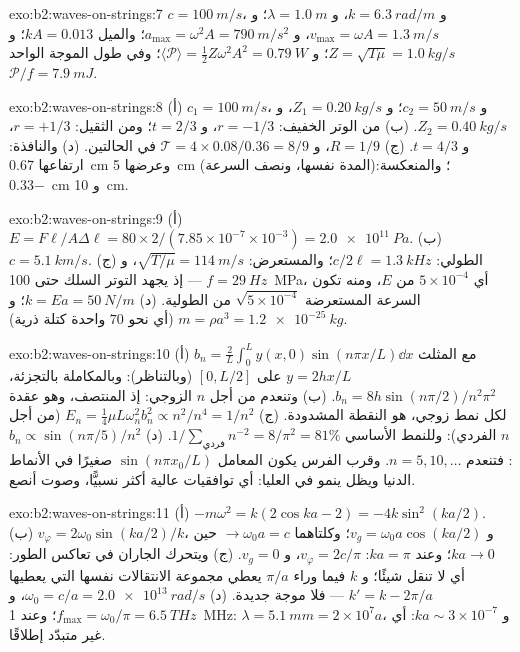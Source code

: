 \begin{solution}{exo:b2:waves-on-strings:7}
$c = \qty{100}{m/s}$، و $k = \qty{6.3}{rad/m}$، و $\lambda = \qty{1.0}{m}$؛ و $v_{\max} = \omega A =
\qty{1.3}{m/s}$، و $a_{\max} = \omega^2A = \qty{790}{m/s^2}$؛ والميل $kA = 0.013$؛ و $Z =
\sqrt{T\mu} = \qty{1.0}{kg/s}$؛ و $\langle\mathcal P\rangle = \tfrac12Z\omega^2A^2 = \qty{0.79}{W}$؛
وفي طول الموجة الواحد $\mathcal P/f = \qty{7.9}{mJ}$.
\end{solution}

\begin{solution}{exo:b2:waves-on-strings:8}
(أ) $c_1 = \qty{100}{m/s}$، و $c_2 = \qty{50}{m/s}$؛ و $Z_1 = \qty{0.20}{kg/s}$، و $Z_2 = \qty{0.40}{kg/s}$.
(ب) من الوتر الخفيف: $r = -1/3$، و $t = 2/3$؛ ومن الثقيل: $r =
+1/3$، و $t = 4/3$. (ج) $R = 1/9$، و $\mathcal T = 4 \times 0.08/0.36 = 8/9$ في الحالتين.
(د) والنافذة: ارتفاعها \qty{0.67}{cm} وعرضها \qty{5}{cm} (المدة نفسها، ونصف
السرعة)؛ والمنعكسة: \qty{-0.33}{cm} و \qty{10}{cm}.
\end{solution}

\begin{solution}{exo:b2:waves-on-strings:9}
(أ) $E = F\ell/A\Delta\ell = 80 \times 2/(7.85 \times 10^{-7} \times 10^{-3}) = \qty{2.0e11}{Pa}$.
(ب) $c = \qty{5.1}{km/s}$. (ج) الطولي: $c/2\ell = \qty{1.3}{kHz}$؛ والمستعرض:
$\sqrt{T/\mu} = \qty{114}{m/s}$، و $f = \qty{29}{Hz}$ --- إذ يجهد التوتر
السلك حتى \qty{100}{MPa}، أي $5 \times 10^{-4}$ من $E$، ومنه تكون السرعة المستعرضة
$\sqrt{5 \times 10^{-4}}$ من الطولية. (د) $k = Ea = \qty{50}{N/m}$؛ و $m
= \rho a^3 = \qty{1.2e-25}{kg}$ (أي نحو $70$ واحدة كتلة ذرية).
\end{solution}

\begin{solution}{exo:b2:waves-on-strings:10}
(أ) $b_n = \frac2L\int_0^Ly(x, 0)\sin(n\pi x/L)\dd x$ مع المثلث $y =
2hx/L$ على $[0, L/2]$ (وبالتناظر): وبالمكاملة بالتجزئة، $b_n = 8h\sin(n\pi/2)
/n^2\pi^2$. (ب) وتنعدم من أجل $n$ الزوجي: إذ المنتصف، وهو عقدة لكل نمط زوجي،
هو النقطة المشدودة. (ج) $E_n = \tfrac14\mu L\omega_n^2b_n^2 \propto n^2/n^4 = 1/n^2$
(من أجل $n$ الفردي): وللنمط الأساسي $1/\sum_{\text{فردي}}n^{-2} = 8/\pi^2 = 81\%$. (د)
$b_n \propto \sin(n\pi/5)/n^2$: فتنعدم $n = 5, 10, \dots$. وقرب الفرس يكون
المعامل $\sin(n\pi x_0/L)$ صغيرًا في الأنماط الدنيا ويظل ينمو
في العليا: أي توافقيات عالية أكثر نسبيًّا، وصوت أنصع.
\end{solution}

\begin{solution}{exo:b2:waves-on-strings:11}
(أ) $-m\omega^2 = k(2\cos ka - 2) = -4k\sin^2(ka/2)$. (ب) $v_\varphi = 2\omega_0\sin(ka/2)
/k$، و $v_g = \omega_0a\cos(ka/2)$؛ وكلتاهما $\to \omega_0a = c$ حين $ka \to 0$؛ وعند $ka = \pi$:
$v_\varphi = 2c/\pi$، و $v_g = 0$. (ج) ويتحرك الجاران في تعاكس الطور: أي  لا تنقل شيئًا؛ و $k$ فيما وراء $\pi/a$ يعطي مجموعة الانتقالات
نفسها التي يعطيها $k' = k - 2\pi/a$ --- فلا موجة جديدة. (د) $\omega_0 = c/a =
\qty{2.0e13}{rad/s}$، و $f_{\max} = \omega_0/\pi = \qty{6.5}{THz}$؛ وعند \qty{1}{MHz}: $\lambda =
\qty{5.1}{mm} = 2 \times 10^7a$، و $ka \sim 3 \times 10^{-7}$: أي غير متبدّد إطلاقًا.
\end{solution}

